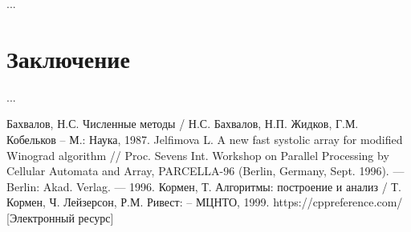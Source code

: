 \documentclass[12pt, a4paper]{report}
\begin{document}
	\newpage
	
 	...

	\chapter*{Заключение}
	...
	
	\newpage
	
	\begin{thebibliography}{}
	 Бахвалов, Н.С. Численные методы / Н.С. Бахвалов, Н.П. Жидков, Г.М. Кобельков – М.: Наука, 1987.
	 Jelfimova L. A new fast systolic array for modified Winograd algorithm // Proc. Sevens Int. Workshop on Parallel Processing by Cellular Automata and Array, PARCELLA-96 (Berlin, Germany, Sept. 1996). — Berlin: Akad. Verlag. — 1996.
	 Кормен, Т. Алгоритмы: построение и анализ / Т. Кормен, Ч. Лейзерсон, Р.М. Ривест: – МЦНТО, 1999.
	 https://cppreference.com/ [Электронный ресурс]
	\end{thebibliography}
\end{document}
